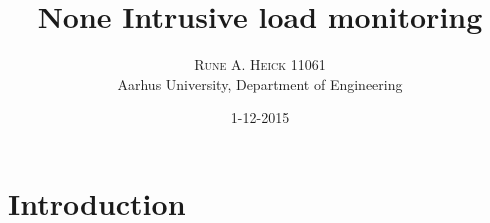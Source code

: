 


\title{\vspace{-15mm}\fontsize{24pt}{10pt}\selectfont\textbf{None Intrusive load monitoring}} %

\author{
\large
\textsc{Rune A. Heick 11061}\\[2mm] %
\normalsize Aarhus University, Department of Engineering \\ %
\vspace{-5mm}
}
\date{1-12-2015}


\setlength{\abovedisplayskip}{1cm}
\setlength{\belowdisplayskip}{.8cm}
\maketitle %

\newpage

\begin{abstract}
\lipsum[7] %
\end{abstract}

\newpage

\tableofcontents


\chapter{Introduction}
\lipsum[1] %

 

\begingroup
	\raggedright
	
\endgroup



